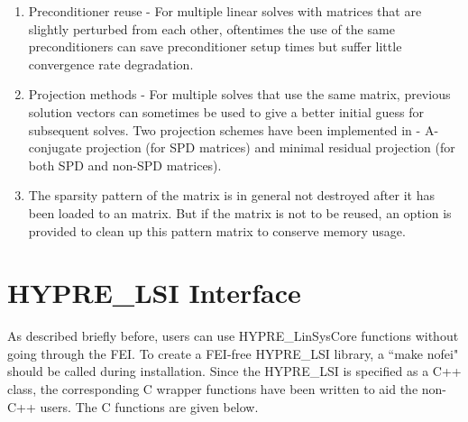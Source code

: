 \begin{enumerate}
\item Preconditioner reuse - For multiple linear solves with matrices that are
      slightly perturbed from each other, oftentimes the use of the same 
      preconditioners can save preconditioner setup times but suffer little
      convergence rate degradation.
\item Projection methods - For multiple solves that use the same matrix,
      previous solution vectors can sometimes be used to give a better initial
      guess for subsequent solves.  Two projection schemes have been implemented
      in \hypre{} - A-conjugate projection (for SPD matrices) and minimal 
      residual projection (for both SPD and non-SPD matrices).
\item The sparsity pattern of the matrix is in general not destroyed after
      it has been loaded to an \hypre{} matrix.  But if the matrix is not to
      be reused, an option is provided to clean up this pattern matrix to
      conserve memory usage.
\end{enumerate}

\section{HYPRE\_LSI Interface}

As described briefly before, users can use {\sf HYPRE\_LinSysCore}
functions without going through the FEI.  To create a FEI-free {\sf HYPRE\_LSI} 
library, a ``make nofei" should be called during installation.
Since the {\sf HYPRE\_LSI} is specified as a C++ class, the corresponding
C wrapper functions have been written to aid the non-C++ users.  The
C functions are given below.

